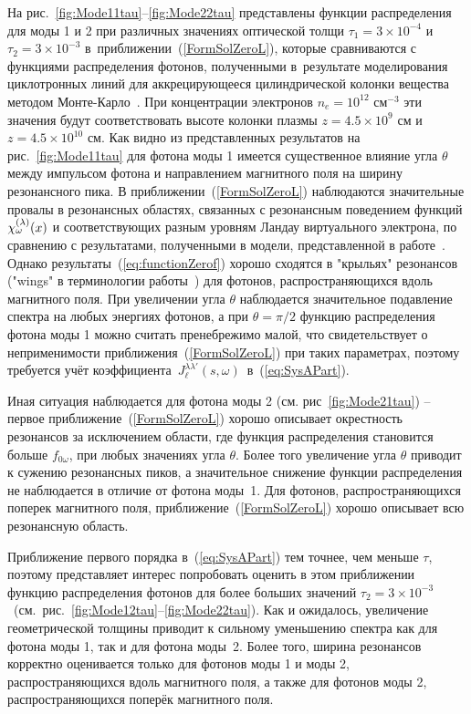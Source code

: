 \documentclass[14pt, russian]{article}
\begin{document}
На рис.~\ref{fig:Mode11tau}--\ref{fig:Mode22tau} представлены функции распределения для моды 1 и 2 при различных значениях оптической толщи $\tau_{1}=3\times 10^{-4} $  и $\tau_{2}=3\times 10^{-3}$ в~приближении~(\ref{FormSolZeroL}), которые сравниваются с  функциями распределения фотонов, полученными в~результате моделирования циклотронных линий для аккрецирующееся цилиндрической колонки вещества методом Монте-Карло~\cite{Schonherr:2007}. При концентрации электронов $n_e = 10^{12} \text{ см}^{-3}$ эти значения будут соответствовать высоте колонки плазмы $z=4.5\times 10^9$ см и $z=4.5\times 10^{10}$ см. Как видно из представленных результатов на рис.~\ref{fig:Mode11tau} для фотона моды 1 имеется существенное влияние угла $\theta$ между импульсом фотона и направлением магнитного поля на ширину резонансного пика. В приближении~(\ref{FormSolZeroL}) наблюдаются значительные провалы в резонансных областях, связанных с резонансным поведением функций ${\cal \chi}_\omega^{(\lambda)}(x)$ и соответствующих разным уровням Ландау виртуального электрона, по сравнению с  результатами, полученными в модели, представленной в работе~\cite{Schonherr:2007}. Однако результаты~(\ref{eq:functionZerof}) хорошо сходятся в "крыльях" резонансов ("wings"  в терминологии работы~\cite{Schonherr:2007})  для фотонов, распространяющихся вдоль магнитного поля. При увеличении угла $\theta$ наблюдается значительное подавление спектра на любых энергиях фотонов, а при $\theta = \pi/2$ функцию распределения фотона моды 1 можно считать пренебрежимо малой, что свидетельствует о неприменимости приближения~(\ref{FormSolZeroL}) при таких параметрах, поэтому требуется учёт коэффициента~$J_\ell^{\lambda\lambda'}(s,\omega)$~в~(\ref{eq:SysAPart}). 

Иная ситуация наблюдается для фотона моды 2 (см. рис~\ref{fig:Mode21tau}) -- первое приближение~(\ref{FormSolZeroL}) хорошо описывает окрестность резонансов за исключением области, где функция распределения становится больше $f_{0\omega}$, при любых значениях угла $\theta$. Более того увеличение угла $\theta$ приводит к сужению резонансных пиков, а значительное снижение функции распределения не наблюдается в отличие от фотона моды~1. Для фотонов, распространяющихся поперек магнитного поля, приближение~(\ref{FormSolZeroL}) хорошо описывает всю резонансную область. 

Приближение первого порядка в~(\ref{eq:SysAPart}) тем точнее, чем меньше $\tau$, поэтому представляет интерес попробовать оценить в этом приближении функцию распределения фотонов для более больших значений $\tau_{2}= 3 \times 10^{-3}$~(см.~рис.~\ref{fig:Mode12tau}--\ref{fig:Mode22tau}). Как и ожидалось, увеличение геометрической толщины приводит к сильному уменьшению спектра как для фотона моды 1, так и для фотона моды~2. Более того, ширина резонансов корректно оценивается только для фотонов моды 1 и моды 2, распространяющихся вдоль магнитного поля, а также для фотонов моды 2, распространяющихся поперёк магнитного поля. 
\end{document}

